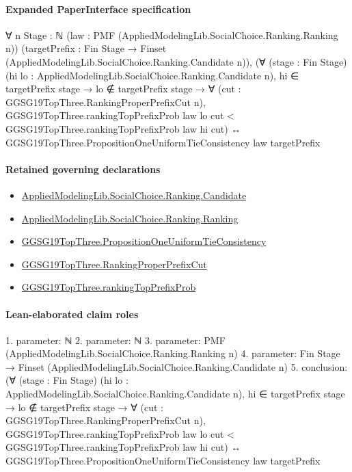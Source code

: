 \documentclass[10pt]{article}
\begin{document}
\paragraph{Expanded PaperInterface specification}
\begin{ReviewVerbatim}
∀ {n Stage : ℕ} (law : PMF (AppliedModelingLib.SocialChoice.Ranking.Ranking n))
  (targetPrefix : Fin Stage → Finset (AppliedModelingLib.SocialChoice.Ranking.Candidate n)),
  (∀ (stage : Fin Stage) (hi lo : AppliedModelingLib.SocialChoice.Ranking.Candidate n),
      hi ∈ targetPrefix stage →
        lo ∉ targetPrefix stage →
          ∀ (cut : GGSG19TopThree.RankingProperPrefixCut n),
            GGSG19TopThree.rankingTopPrefixProb law lo cut < GGSG19TopThree.rankingTopPrefixProb law hi cut) ↔
    GGSG19TopThree.PropositionOneUniformTieConsistency law targetPrefix
\end{ReviewVerbatim}

\paragraph{Retained governing declarations}
\begin{itemize}\raggedright
\item \hyperlink{governing-declaration-8c0e6c25845ae78a}{Applied\allowbreak{}Modeling\allowbreak{}Lib.\allowbreak{}Social\allowbreak{}Choice.\allowbreak{}Ranking.\allowbreak{}Candidate}
\item \hyperlink{governing-declaration-5cde54446d1ae021}{Applied\allowbreak{}Modeling\allowbreak{}Lib.\allowbreak{}Social\allowbreak{}Choice.\allowbreak{}Ranking.\allowbreak{}Ranking}
\item \hyperlink{governing-declaration-708195883e6fe5a0}{GGSG19\allowbreak{}Top\allowbreak{}Three.\allowbreak{}Proposition\allowbreak{}One\allowbreak{}Uniform\allowbreak{}Tie\allowbreak{}Consistency}
\item \hyperlink{governing-declaration-22eb6cc53fca60ee}{GGSG19\allowbreak{}Top\allowbreak{}Three.\allowbreak{}Ranking\allowbreak{}Proper\allowbreak{}Prefix\allowbreak{}Cut}
\item \hyperlink{governing-declaration-aedcbec42eb03a84}{GGSG19\allowbreak{}Top\allowbreak{}Three.\allowbreak{}ranking\allowbreak{}Top\allowbreak{}Prefix\allowbreak{}Prob}
\end{itemize}
\paragraph{Lean-elaborated claim roles}\begin{ReviewVerbatim}
1. parameter: ℕ
2. parameter: ℕ
3. parameter: PMF (AppliedModelingLib.SocialChoice.Ranking.Ranking n)
4. parameter: Fin Stage → Finset (AppliedModelingLib.SocialChoice.Ranking.Candidate n)
5. conclusion: (∀ (stage : Fin Stage) (hi lo : AppliedModelingLib.SocialChoice.Ranking.Candidate n),
    hi ∈ targetPrefix stage →
      lo ∉ targetPrefix stage →
        ∀ (cut : GGSG19TopThree.RankingProperPrefixCut n),
          GGSG19TopThree.rankingTopPrefixProb law lo cut < GGSG19TopThree.rankingTopPrefixProb law hi cut) ↔
  GGSG19TopThree.PropositionOneUniformTieConsistency law targetPrefix
\end{ReviewVerbatim}
\end{document}
